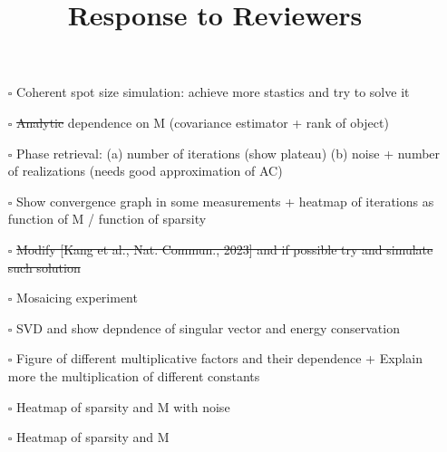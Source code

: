 \documentclass[12pt]{article}
\begin{document}
\begin{itemize}

\item[\rlap{\raisebox{0.3ex}{\hspace{0.4ex}\scriptsize \ding{51}}}$\square$]
Coherent spot size simulation: achieve more stastics and try to solve it

\item[\rlap{\raisebox{0.3ex}{\hspace{0.4ex}\scriptsize \ding{51}}}$\square$]
\st{Analytic} dependence on M (covariance estimator + rank of object) 

\item[\rlap{\raisebox{0.3ex}{\hspace{0.4ex}\scriptsize \ding{51}}}$\square$]
Phase retrieval: (a) number of iterations (show plateau) (b) noise + number of realizations (needs good approximation of AC)

\item[\rlap{\raisebox{0.3ex}{\hspace{0.4ex}\scriptsize \ding{51}}}$\square$]
Show convergence graph in some measurements + heatmap of iterations as function of M / function of sparsity

\item[\rlap{\raisebox{0.3ex}{\hspace{0.4ex}\scriptsize \ding{51}}}$\square$]
\st{Modify [Kang et al., Nat. Commun., 2023] and if possible try and simulate such solution}

\item[$\square$]
Mosaicing experiment

\item[$\square$]
SVD and show depndence of singular vector and energy conservation

\item[\rlap{\raisebox{0.3ex}{\hspace{0.4ex}\scriptsize \ding{55}}}$\square$]
Figure of different multiplicative factors and their dependence + Explain more the multiplication of different constants 

\item[\rlap{\raisebox{0.3ex}{\hspace{0.4ex}\scriptsize \ding{51}}}$\square$]
Heatmap of sparsity and M with noise

\item[\rlap{\raisebox{0.3ex}{\hspace{0.4ex}\scriptsize \ding{51}}}$\square$]
Heatmap of sparsity and M

\end{itemize}
\newpage
\title{Response to Reviewers}
\end{document}
